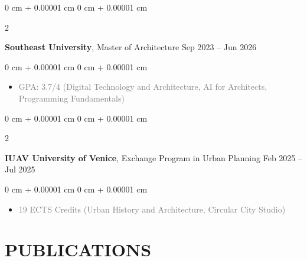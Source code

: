 \documentclass[10pt, letterpaper]{article}
\newenvironment{highlights}{
    \begin{itemize}[
        topsep=0.10 cm,
        parsep=0.10 cm,
        partopsep=0pt,
        itemsep=0pt,
        leftmargin=0 cm + 10pt
    ]
}{
    \end{itemize}
} %
\newenvironment{onecolentry}{
    \begin{adjustwidth}{
        0 cm + 0.00001 cm
    }{
        0 cm + 0.00001 cm
    }
}{
    \end{adjustwidth}
} %
\newenvironment{twocolentry}[2][]{
    \onecolentry
    \def\secondColumn{#2}
    \setcolumnwidth{\fill, 4.5 cm}
    \begin{paracol}{2}
}{
    \switchcolumn \raggedleft \secondColumn
    \end{paracol}
    \endonecolentry
} %
\begin{document}
        \begin{twocolentry}{
            Sep 2023 – Jun 2026
        }
            \textbf{Southeast University}, Master of Architecture \end{twocolentry}

        \vspace{0.10 cm}
        \begin{onecolentry}
            \begin{highlights}
                \item\textcolor{gray} {GPA: 3.7/4   (Digital Technology and Architecture, AI for Architects, Programming Fundamentals)}
            \end{highlights}
        \end{onecolentry}
            
        \begin{twocolentry}{
            Feb 2025 – Jul 2025
        }
            \textbf{IUAV University of Venice}, Exchange Program in Urban Planning \end{twocolentry}

        \vspace{0.10 cm}
        \begin{onecolentry}
            \begin{highlights}
                \item\textcolor{gray} {19 ECTS Credits  (Urban History and Architecture, Circular City Studio)}
            \end{highlights}
        \end{onecolentry}




    
    \section{PUBLICATIONS}
    
    
    
\end{document}
